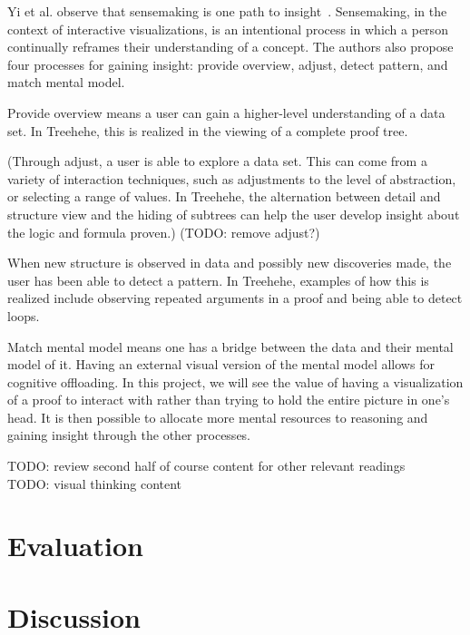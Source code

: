 \documentclass[conference]{IEEEtran}
\newcommand{\projectname}{Treehehe}
\begin{document}
Yi et al. observe that sensemaking is one path to insight~\cite{insights-yi+etal}. Sensemaking, in the context of interactive visualizations, is an intentional process in which a person continually reframes their understanding of a concept. The authors also propose four processes for gaining insight: provide overview, adjust, detect pattern, and match mental model.

Provide overview means a user can gain a higher-level understanding of a data set. In \projectname{}, this is realized in the viewing of a complete proof tree.

(Through adjust, a user is able to explore a data set. This can come from a variety of interaction techniques, such as adjustments to the level of abstraction, or selecting a range of values. In \projectname{}, the alternation between detail and structure view and the hiding of subtrees can help the user develop insight about the logic and formula proven.) (TODO: remove adjust?)

When new structure is observed in data and possibly new discoveries made, the user has been able to detect a pattern. In \projectname{}, examples of how this is realized include observing repeated arguments in a proof and being able to detect loops.

Match mental model means one has a bridge between the data and their mental model of it. Having an external visual version of the mental model allows for cognitive offloading. In this project, we will see the value of having a visualization of a proof to interact with rather than trying to hold the entire picture in one’s head. It is then possible to allocate more mental resources to reasoning and gaining insight through the other processes.

TODO: review second half of course content for other relevant readings \\

TODO: visual thinking content \\

\section{Evaluation}
\label{sec:evaluation}



\section{Discussion}
\label{sec:discussion}
\end{document}
